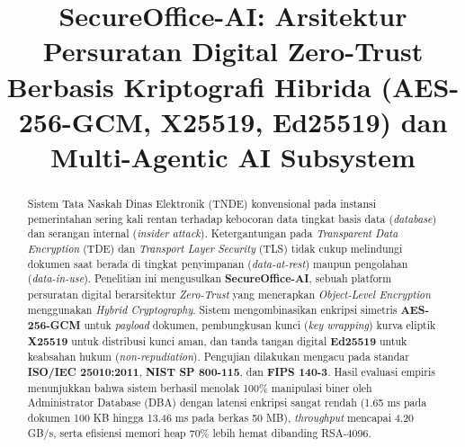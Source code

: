 \documentclass[conference]{IEEEtran}
\begin{document}
\title{SecureOffice-AI: Arsitektur Persuratan Digital Zero-Trust Berbasis Kriptografi Hibrida (AES-256-GCM, X25519, Ed25519) dan Multi-Agentic AI Subsystem}

\author{
}

\maketitle

\begin{abstract}
Sistem Tata Naskah Dinas Elektronik (TNDE) konvensional pada instansi pemerintahan sering kali rentan terhadap kebocoran data tingkat basis data (\textit{database}) dan serangan internal (\textit{insider attack}). Ketergantungan pada \textit{Transparent Data Encryption} (TDE) dan \textit{Transport Layer Security} (TLS) tidak cukup melindungi dokumen saat berada di tingkat penyimpanan (\textit{data-at-rest}) maupun pengolahan (\textit{data-in-use}). Penelitian ini mengusulkan \textbf{SecureOffice-AI}, sebuah platform persuratan digital berarsitektur \textit{Zero-Trust} yang menerapkan \textit{Object-Level Encryption} menggunakan \textit{Hybrid Cryptography}. Sistem mengombinasikan enkripsi simetris \textbf{AES-256-GCM} untuk \textit{payload} dokumen, pembungkusan kunci (\textit{key wrapping}) kurva eliptik \textbf{X25519} untuk distribusi kunci aman, dan tanda tangan digital \textbf{Ed25519} untuk keabsahan hukum (\textit{non-repudiation}). Pengujian dilakukan mengacu pada standar \textbf{ISO/IEC 25010:2011}, \textbf{NIST SP 800-115}, dan \textbf{FIPS 140-3}. Hasil evaluasi empiris menunjukkan bahwa sistem berhasil menolak 100\% manipulasi biner oleh Administrator Database (DBA) dengan latensi enkripsi sangat rendah (1.65 ms pada dokumen 100 KB hingga 13.46 ms pada berkas 50 MB), \textit{throughput} mencapai 4.20 GB/s, serta efisiensi memori heap 70\% lebih hemat dibanding RSA-4096.


\end{abstract}
\end{document}
